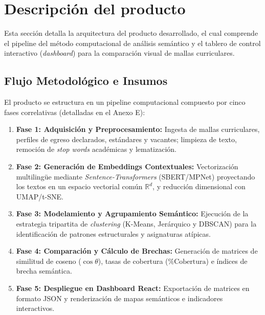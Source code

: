 \section{Descripción del producto}
\label{cap:productDescription}

Esta sección detalla la arquitectura del producto desarrollado, el cual comprende el pipeline del método computacional de análisis semántico y el tablero de control interactivo (\textit{dashboard}) para la comparación visual de mallas curriculares.

\subsection{Flujo Metodológico e Insumos}
\label{sec:flow_inputs}

El producto se estructura en un pipeline computacional compuesto por cinco fases correlativas (detalladas en el Anexo E):
\begin{enumerate}[label=\arabic*.]
	\item \textbf{Fase 1: Adquisición y Preprocesamiento:} Ingesta de mallas curriculares, perfiles de egreso declarados, estándares y vacantes; limpieza de texto, remoción de \textit{stop words} académicas y lematización.
	\item \textbf{Fase 2: Generación de Embeddings Contextuales:} Vectorización multilingüe mediante \textit{Sentence-Transformers} (SBERT/MPNet) proyectando los textos en un espacio vectorial común $\mathbb{R}^d$, y reducción dimensional con UMAP/t-SNE.
	\item \textbf{Fase 3: Modelamiento y Agrupamiento Semántico:} Ejecución de la estrategia tripartita de \textit{clustering} (K-Means, Jerárquico y DBSCAN) para la identificación de patrones estructurales y asignaturas atípicas.
	\item \textbf{Fase 4: Comparación y Cálculo de Brechas:} Generación de matrices de similitud de coseno ($\cos \theta$), tasas de cobertura ($\% \text{Cobertura}$) e índices de brecha semántica.
	\item \textbf{Fase 5: Despliegue en Dashboard React:} Exportación de matrices en formato JSON y renderización de mapas semánticos e indicadores interactivos.
\end{enumerate}

